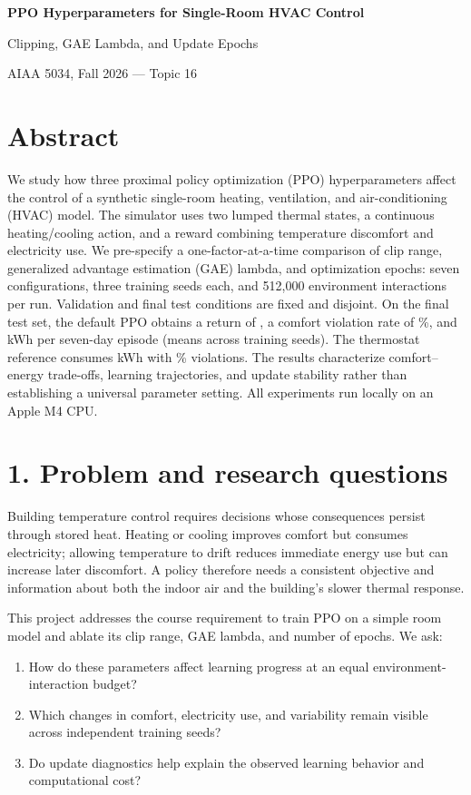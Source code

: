 \documentclass[10pt,a4paper]{article}
\begin{document}
\begin{center}
{\LARGE\bfseries PPO Hyperparameters for Single-Room HVAC Control}\par
\vspace{3mm}
{\large Clipping, GAE Lambda, and Update Epochs}\par
\vspace{3mm}
AIAA 5034, Fall 2026 --- Topic 16\par
\TeamAuthors
\end{center}

\section*{Abstract}
We study how three proximal policy optimization (PPO) hyperparameters affect the control of a synthetic single-room heating, ventilation, and air-conditioning (HVAC) model. The simulator uses two lumped thermal states, a continuous heating/cooling action, and a reward combining temperature discomfort and electricity use. We pre-specify a one-factor-at-a-time comparison of clip range, generalized advantage estimation (GAE) lambda, and optimization epochs: seven configurations, three training seeds each, and 512,000 environment interactions per run. Validation and final test conditions are fixed and disjoint. On the final test set, the default PPO obtains a return of \DefaultReturn{}, a comfort violation rate of \DefaultCVR{}\%, and \DefaultEnergy{} kWh per seven-day episode (means across training seeds). The thermostat reference consumes \ThermostatEnergy{} kWh with \ThermostatCVR{}\% violations. \AbstractFinding{} The results characterize comfort--energy trade-offs, learning trajectories, and update stability rather than establishing a universal parameter setting. All experiments run locally on an Apple M4 CPU.

\section*{1. Problem and research questions}
Building temperature control requires decisions whose consequences persist through stored heat. Heating or cooling improves comfort but consumes electricity; allowing temperature to drift reduces immediate energy use but can increase later discomfort. A policy therefore needs a consistent objective and information about both the indoor air and the building's slower thermal response.

This project addresses the course requirement to train PPO on a simple room model and ablate its clip range, GAE lambda, and number of epochs. We ask:
\begin{enumerate}
\item How do these parameters affect learning progress at an equal environment-interaction budget?
\item Which changes in comfort, electricity use, and variability remain visible across independent training seeds?
\item Do update diagnostics help explain the observed learning behavior and computational cost?
\end{enumerate}
\end{document}
